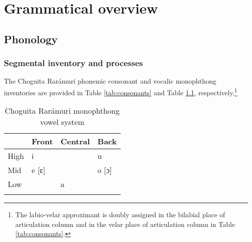 \chapter{Grammatical overview}
\label{chap: grammatical overview}

\section{Phonology}
\label{sec: phonology}

\subsection{Segmental inventory and processes}
\label{subsec: segmental inventory and processes}

The Choguita Rarámuri phonemic consonant and vocalic monophthong inventories are provided in Table \ref{tab:consonants} and Table \ref{tab:vowels}, respectively.\footnote{The labio-velar approximant is doubly assigned in the bilabial place of articulation column and in the velar place of articulation column in Table \ref{tab:consonants}.}

\begin{table}
\caption{{Phonemic inventory of Choguita Raramuri consonants}}
\label{tab:consonants}
\end{table}
\hspace{3cm}

\begin{table}
\caption{{Choguita Rarámuri monophthong vowel system}}
\label{tab:vowels}

\begin{tabularx}{\textwidth}{XXXX}
\lsptoprule
& Front & Central & Back\\
\midrule
 High & i &  & u\\
 Mid & e [ɛ] &  & o [ɔ] \\
 Low &  & a & \\
\lspbottomrule
\end{tabularx}
\end{table}
\hspace{3cm}

